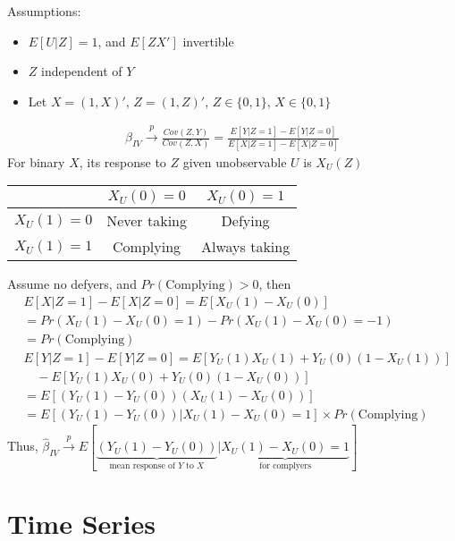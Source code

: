 \documentclass[10pt,landscape]{article}
\begin{document}
\begin{multicols}{3}
Assumptions: 
\begin{itemize}
  \item $E[U|Z] = 1$, and $E[ZX']$ invertible
  \item $Z$ independent of $Y$
  \item Let $X = (1, X)'$, $Z = (1, Z)'$, $Z \in \{ 0, 1 \}$, $X \in \{ 0, 1 \}$
\end{itemize}
\begin{align*}
  \hat{\beta}_{IV} \xrightarrow{p} \frac{Cov(Z, Y)}{Cov(Z, X)} = \frac{E[Y|Z = 1] - E[Y|Z = 0]}{E[X|Z = 1] - E[X|Z = 0]}
\end{align*}
For binary $X$, its response to $Z$ given unobservable $U$ is $X_U(Z)$
\begin{center}
  \begin{tabular}{c| c c}
    \toprule
    & $X_U(0) = 0$ & $X_U(0) = 1$ \\
    \midrule
    $X_U(1) = 0$ & Never taking & Defying \\
    $X_U(1) = 1$ & Complying & Always taking \\
    \bottomrule
  \end{tabular}
\end{center}
Assume no defyers, and $Pr(\text{Complying}) > 0$, then
\begin{align*}
  &E[X|Z = 1] - E[X|Z = 0] = E[X_U(1) - X_U(0)] \\ 
  &= Pr(X_U(1) - X_U(0) = 1) - Pr(X_U(1) - X_U(0) = -1) \\
  &= Pr(\text{Complying})\\ 
  &E[Y|Z = 1] - E[Y|Z = 0] = E[Y_U(1)X_U(1) + Y_U(0)(1-X_U(1))] \\
  &\quad - E[Y_U(1)X_U(0) + Y_U(0)(1-X_U(0))] \tag{since $Y = Y_U(1)X + Y_U(0)(1-X)$}\\
  &= E[(Y_U(1) - Y_U(0))(X_U(1) - X_U(0))] \\ 
  &= E[(Y_U(1) - Y_U(0))|X_U(1) - X_U(0) = 1] \times Pr(\text{Complying})
\end{align*}
Thus, $\hat{\beta}_{IV} \xrightarrow{p} E[\underbrace{(Y_U(1) - Y_U(0))}_{\text{mean response of $Y$ to $X$}}|\underbrace{X_U(1) - X_U(0) = 1}_{\text{for complyers}}]$


\section{Time Series}


\end{multicols}
\end{document}

